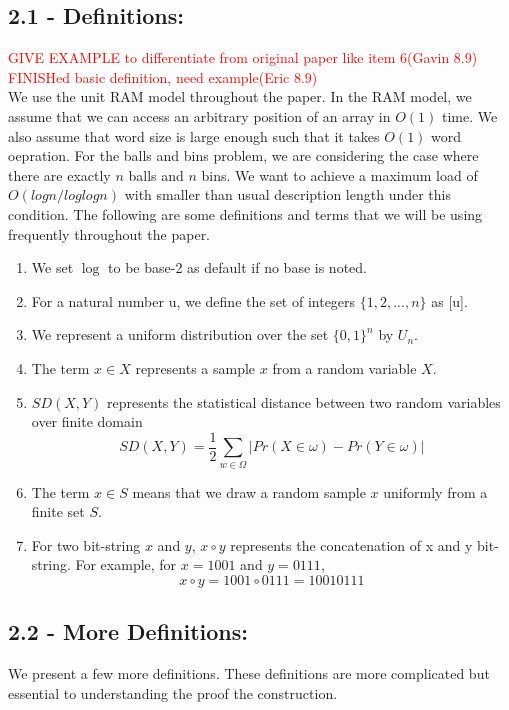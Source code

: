 \documentclass[letterpaper]{article} %
\begin{document}
	\subsection{2.1 - Definitions:}
	 \textcolor{red}{GIVE EXAMPLE to differentiate from original paper like item 6(Gavin 8.9)} \\
	\textcolor{red}{FINISHed basic definition, need example(Eric 8.9)} \\
	We use the unit RAM model throughout the paper. In the RAM model, we assume that we can access an arbitrary position of an array in $O(1)$ time. We also assume that word size is large enough such that it takes $O(1)$ word oepration. For the balls and bins problem, we are considering the case where there are exactly $n$ balls and $n$ bins. We want to achieve a maximum load of $O(log n/ log log n)$ with smaller than usual description length under this condition. The following are some definitions and terms that we will be using frequently throughout the paper.
	\begin{enumerate}
	\item We set $\log$ to be base-2 as default if no base is noted. 
	\item For a natural number u, we define the set of integers $\{1, 2, ..., n\}$ as [u].  
	\item We represent a uniform distribution over the set $\{0, 1\}^n$ by $U_n$.
	\item The term $x \in X$ represents a sample $x$ from a random variable $X$.
	\item  $SD(X, Y)$ represents the statistical distance between two random variables over finite domain
		$$SD(X, Y) = \frac{1}{2}\sum_{w\in \Omega}| Pr(X\in \omega) - Pr(Y\in \omega)|$$
	\item The term $x \in S$ means that we draw a random sample $x$ uniformly from a finite set $S$.
	\item For two bit-string $x$ and $y$, $x \circ y$ represents the concatenation of x and y bit-string. For example, for $x = 1001$ and $y = 0111$, 
		$$x \circ y = 1001 \circ 0111 = 10010111$$
	\end{enumerate}
	
	\subsection{2.2 - More Definitions:}
	We present a few more definitions. These definitions are more complicated but essential to understanding the proof the construction. \\
	
\end{document}
